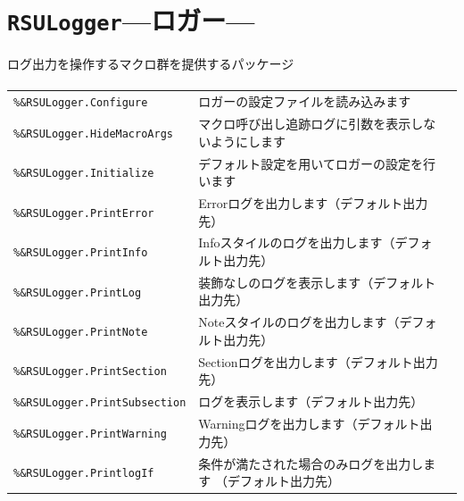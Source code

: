 \section{\texttt{RSULogger}\;---\;ロガー\;---}\label{sec:RSULogger}
ログ出力を操作するマクロ群を提供するパッケージ
\paragraph{\DocStrTitleRDMPackageFunctionList}
\begin{center}
{\footnotesize
\begin{xltabular}{\textwidth}{|p{4truecm}|X|p{1.2truecm}|}
\hline
\thead{\DocStrHeaderFunctionName}&\thead{\DocStrDescription}&\thead{\DocStrRefto}\\
\hline
\hline
\texttt{\%\&RSULogger.Configure}&ロガーの設定ファイルを読み込みます&\\
\hline
\texttt{\%\&RSULogger.HideMacroArgs}&マクロ呼び出し追跡ログに引数を表示しないようにします&\\
\hline
\texttt{\%\&RSULogger.Initialize}&デフォルト設定を用いてロガーの設定を行います&\\
\hline
\texttt{\%\&RSULogger.PrintError}&Errorログを出力します（デフォルト出力先）&\\
\hline
\texttt{\%\&RSULogger.PrintInfo}&Infoスタイルのログを出力します（デフォルト出力先）&\\
\hline
\texttt{\%\&RSULogger.PrintLog}&装飾なしのログを表示します（デフォルト出力先）&\\
\hline
\texttt{\%\&RSULogger.PrintNote}&Noteスタイルのログを出力します（デフォルト出力先）&\\
\hline
\texttt{\%\&RSULogger.PrintSection}&Sectionログを出力します（デフォルト出力先）&\\
\hline
\texttt{\%\&RSULogger.PrintSubsection}&ログを表示します（デフォルト出力先）&\\
\hline
\texttt{\%\&RSULogger.PrintWarning}&Warningログを出力します（デフォルト出力先）&\\
\hline
\texttt{\%\&RSULogger.PrintlogIf}&条件が満たされた場合のみログを出力します （デフォルト出力先）&\\

\end{xltabular}}
\end{center}
